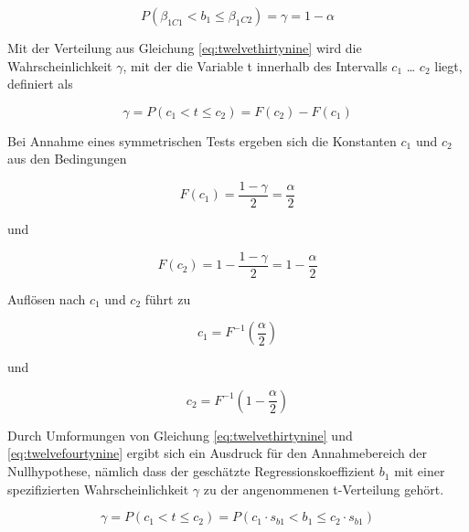 \begin{equation}\label{eq:twelvefourtyeight}
P\left(\beta _{1C1} <b_{1} \le \beta _{1} {}_{C2} \right)=\gamma =1-\alpha
\end{equation}

\noindent Mit der Verteilung aus Gleichung \eqref{eq:twelvethirtynine} wird die Wahrscheinlichkeit $\gamma$, mit der die Variable t innerhalb des Intervalls $c_{1}$ {\dots} $c_{2}$ liegt, definiert als

\begin{equation}\label{eq:twelvefourtynine}
\gamma =P(c_{1} <t\le c_{2})=F(c_{2})-F(c_{1})
\end{equation}

\noindent Bei Annahme eines symmetrischen Tests ergeben sich die Konstanten $c_{1}$ und $c_{2}$ aus den Bedingungen

\begin{equation}\label{eq:twelvefifty}
F\left(c_{1} \right)=\dfrac{1-\gamma }{2} =\dfrac{\alpha }{2}
\end{equation}

\noindent und

\begin{equation}\label{eq:twelvefiftyone}
F(c_{2})=1-\dfrac{1-\gamma }{2} =1-\dfrac{\alpha }{2}
\end{equation}

\noindent Aufl\"{o}sen nach $c_{1}$ und $c_{2}$ f\"{u}hrt zu

\begin{equation}\label{eq:twelvefiftytwo}
c_{1} =F^{-1} \left(\dfrac{\alpha }{2} \right)
\end{equation}

\noindent und

\begin{equation}\label{eq:twelvefiftythree}
c_{2} =F^{-1} \left(1-\dfrac{\alpha }{2} \right)
\end{equation}

\noindent Durch Umformungen von Gleichung \eqref{eq:twelvethirtynine} und \eqref{eq:twelvefourtynine} ergibt sich ein Ausdruck f\"{u}r den Annahmebereich der Nullhypothese, n\"{a}mlich dass der gesch\"{a}tzte Regressionskoeffizient $b_{1}$ mit einer spezifizierten Wahrscheinlichkeit $\gamma$ zu der angenommenen t-Verteilung geh\"{o}rt. 

\begin{equation}\label{eq:twelvefiftyfour}
\gamma =P(c_{1} <t\le c_{2})=P\left(c_{1} \cdot s_{b1} <b_{1} \le c_{2} \cdot s_{b1} \right)
\end{equation}

